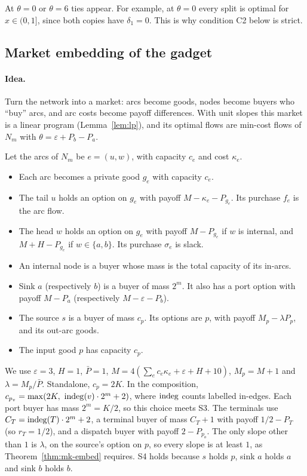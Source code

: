 At $\theta=0$ or $\theta=6$ ties appear. For example, at $\theta=0$ every split is optimal for
$x\in(0,1]$, since both copies have $\delta_1=0$. This is why condition C2 below is strict.

\subsection{Market embedding of the gadget}\label{sec:ar-gadget-market}

\paragraph{Idea.} Turn the network into a market: arcs become goods, nodes become buyers who
``buy'' arcs, and arc costs become payoff differences. With unit slopes this market is a linear program
(Lemma~\ref{lem:lp}), and its optimal flows are min-cost flows of $N_m$ with $\theta=\varepsilon+P_b-P_a$.

Let the arcs of $N_m$ be $e=(u,w)$, with capacity $c_e$ and cost $\kappa_e$.
\begin{itemize}[nosep]
\item Each arc becomes a private good $g_e$ with capacity $c_e$.
\item The tail $u$ holds an option on $g_e$ with payoff $M-\kappa_e-P_{g_e}$. Its purchase $f_e$ is the
arc flow.
\item The head $w$ holds an option on $g_e$ with payoff $M-P_{g_e}$ if $w$ is internal, and
$M+H-P_{g_e}$ if $w\in\{a,b\}$. Its purchase $\sigma_e$ is slack.
\item An internal node is a buyer whose mass is the total capacity of its in-arcs.
\item Sink $a$ (respectively $b$) is a buyer of mass $2^m$. It also has a port option with payoff
$M-P_a$ (respectively $M-\varepsilon-P_b$).
\item The source $s$ is a buyer of mass $c_p$. Its options are $p$, with payoff $M_p-\lambda P_p$, and
its out-arc goods.
\item The input good $p$ has capacity $c_p$.
\end{itemize}

We use $\varepsilon=3$, $H=1$, $\bar P=1$, $M=4(\sum_ec_e\kappa_e+\varepsilon+H+10)$, $M_p=M+1$ and
$\lambda=M_p/\bar P$. Standalone, $c_p=2K$. In the composition, $c_{p_v}=\max(2K,\ \indeg(v)\cdot2^m+2)$,
where $\mathrm{indeg}$ counts labelled in-edges. Each port buyer has mass $2^m=K/2$, so this choice meets S3.
The terminals use $C_T=\mathrm{indeg}(T)\cdot2^m+2$, a terminal buyer of mass $C_T+1$ with payoff $1/2-P_T$ (so
$r_T=1/2$), and a dispatch buyer with payoff $2-P_{p_o}$. The only slope other than $1$ is $\lambda$, on
the source's option on $p$, so every slope is at least $1$, as Theorem~\ref{thm:mk-embed} requires. S4
holds because $s$ holds $p$, sink $a$ holds $a$ and sink $b$ holds $b$.


